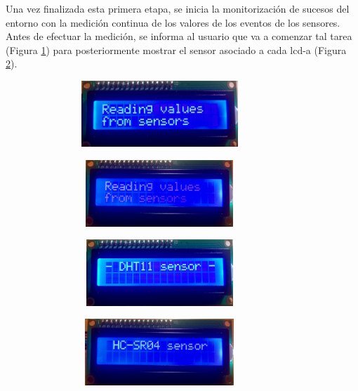 \documentclass[12pt,a4paper, twoside]{report}
\begin{document}
	Una vez finalizada esta primera etapa, se inicia la monitorización de sucesos del entorno con la medición continua de los valores de los eventos de los sensores. Antes de efectuar la medición, se informa al usuario que va a comenzar tal tarea (Figura \ref{fig:hardware_reading}) para posteriormente mostrar el \gls{sensor} asociado a cada \gls{lcd-a} (Figura \ref{fig:hardware_sensor}).
	
	\begin{figure}[!ht]		
		\caption{Prototipo hardware Hyot - Comienzo de la medición.}
 		\begin{subfigure}{0.5\textwidth}
 			\hbox{
 				\hspace{0cm}
 				\includegraphics[width=7cm, height=2.5cm]{Images/hardware/lcd1_reading} 
 			}
		\end{subfigure}
		\begin{subfigure}{0.5\textwidth}
			\hbox{
 				\hspace{1cm}
				\includegraphics[width=7cm, height=2.5cm]{Images/hardware/lcd2_reading}
			}
		\end{subfigure}
		\label{fig:hardware_reading}
	\end{figure}
	
	\begin{figure}[!ht]		
		\caption{Prototipo hardware Hyot - Información del sensor.}
 		\begin{subfigure}{0.5\textwidth}
 			\hbox{
 				\hspace{0cm}
 				\includegraphics[width=7cm, height=2.5cm]{Images/hardware/lcd1_sensor} 
 			}
		\end{subfigure}
		\begin{subfigure}{0.5\textwidth}
			\hbox{
 				\hspace{1cm}
				\includegraphics[width=7cm, height=2.5cm]{Images/hardware/lcd2_sensor}
			}
		\end{subfigure}
		\label{fig:hardware_sensor}
	\end{figure}
	
\end{document}
